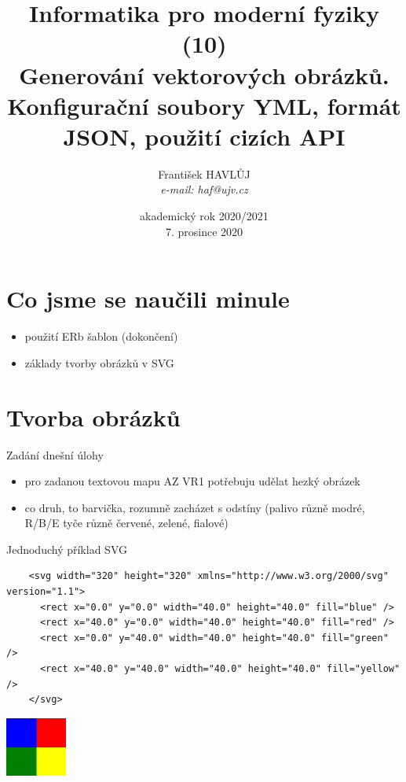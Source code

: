\documentclass{beamer}
\title[IMF (10)]{Informatika pro moderní fyziky (10)\\ Generování vektorových obrázků. Konfigurační soubory YML, formát JSON, použití cizích API}
\author[Franti\v{s}ek HAVL\r{U}J, ORF ÚJV Řež]{Franti\v{s}ek HAVL\r{U}J\\{\scriptsize \emph{e-mail: haf@ujv.cz}}}
\date{akademický rok 2020/2021\\7. prosince 2020}
\institute[ORF ÚJV Řež]
{ÚJV Řež\\oddělení Reaktorové fyziky a podpory palivového cyklu}
\begin{document}
\begin{frame}
  \titlepage
\end{frame}

\begin{frame}
  \tableofcontents
\end{frame}

\section{Co jsme se naučili minule}

\begin{frame}{}
  \begin{itemize}
    \item použití ERb šablon (dokončení)
    \item základy tvorby obrázků v SVG
  \end{itemize}
\end{frame}


\section{Tvorba obrázků}

\begin{frame}{Zadání dnešní úlohy}
  \begin{itemize}
    \item pro zadanou textovou mapu AZ VR1 potřebuju udělat hezký obrázek
    \item co druh, to barvička, rozumně zacházet s odstíny (palivo různě modré, R/B/E tyče různě červené, zelené, fialové)
  \end{itemize}
\end{frame}

\begin{frame}[fragile]{Jednoduchý příklad SVG}
  \tiny
  \begin{verbatim}
    <svg width="320" height="320" xmlns="http://www.w3.org/2000/svg" version="1.1">
      <rect x="0.0" y="0.0" width="40.0" height="40.0" fill="blue" />
      <rect x="40.0" y="0.0" width="40.0" height="40.0" fill="red" />
      <rect x="0.0" y="40.0" width="40.0" height="40.0" fill="green" />
      <rect x="40.0" y="40.0" width="40.0" height="40.0" fill="yellow" />
    </svg>
  \end{verbatim}
  \includegraphics[width=0.15\textwidth]{example}
\end{frame}
\end{document}

